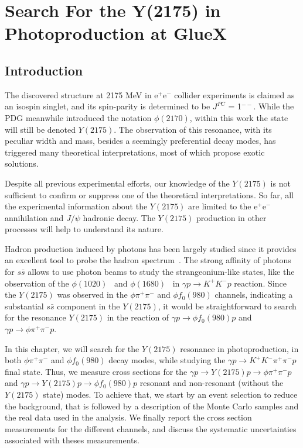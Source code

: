 \chapter{Search For the Y(2175) in Photoproduction at GlueX}
\label{chap.y2175}

\section{Introduction}
\label{chap.y2175.intro}

The discovered structure at 2175 MeV in e$^+$e$^{-}$ collider experiments is claimed as an isospin singlet, and its spin-parity is determined to be $J^{PC}$ = 1$^{--}$. While the PDG meanwhile introduced the notation $\phi(2170)$, within this work the state will still be denoted $Y(2175)$. The observation of this resonance, with its peculiar width and mass, besides a seemingly preferential decay modes, has triggered many theoretical interpretations, most of which propose exotic solutions. 
~\par Despite all previous experimental efforts, our knowledge of the $Y(2175)$ is not sufficient to confirm or suppress one of the theoretical interpretations. So far, all the experimental information about the $Y(2175)$ are limited to the e$^+$e$^{-}$ annihilation and $J/\psi$ hadronic decay. The $Y(2175)$ production in other processes will help to understand its nature.
~\par Hadron production induced by photons has been largely studied since it provides an excellent tool to probe the hadron spectrum~\cite{Ballam68, Meyer70, Wang14, Wang17}. The strong affinity of photons for $s\bar{s}$ allows to use photon beams to study the strangeonium-like states, like the observation of the $\phi(1020)$~\cite{Mibe05} and $\phi(1680)$~\cite{Aston81} in $\gamma p \rightarrow K^{+}K^{-}p$ reaction. Since the $Y(2175)$ was observed in the $\phi \pi^{+}\pi^{-}$ and $\phi f_{0}(980)$ channels, indicating a substantial $s\bar{s}$ component in the $Y(2175)$, it would be straightforward to search for the resonance $Y(2175)$ in the reaction of $\gamma p \rightarrow \phi f_{0}(980)p$ and $\gamma p \rightarrow \phi \pi^{+}\pi^{-}p$.
~\par In this chapter, we will search for the $Y(2175)$ resonance in photoproduction, in both $\phi \pi^{+}\pi^{-}$ and $\phi f_{0}(980)$ decay modes, while studying the $\gamma p \rightarrow K^{+}K^{-} \pi^{+}\pi^{-} p$ final state. Thus, we measure cross sections for the $\gamma p \rightarrow Y(2175) p \rightarrow \phi \pi^+ \pi^{-} p$ and $\gamma p \rightarrow Y(2175) p \rightarrow \phi f_{0}(980) p$ resonant and non-resonant (without the $Y(2175)$ state) modes. To achieve that, we start by an event selection to reduce the background, that is followed by a description of the Monte Carlo samples and the real data used in the analysis. We finally report the cross section measurements for the different channels, and discuss the systematic uncertainties associated with theses measurements.

